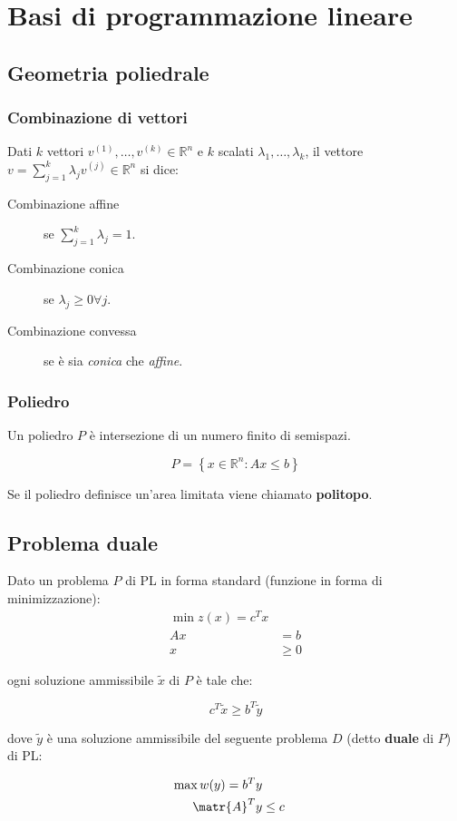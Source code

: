 \documentclass[\main/main.tex]{subfiles}
\begin{document}
\chapter{Basi di programmazione lineare}

\section{Geometria poliedrale}

\subsection{Combinazione di vettori}
Dati $k$ vettori $v^{(1)},\ldots,v^{(k)} \in \mathbb{R}^n$ e $k$ scalati $\lambda_1,\ldots,\lambda_k$, il vettore $v = \sum_{j=1}^k \lambda_j v^{(j)} \in \mathbb{R}^n$ si dice:

\begin{description}
  \item[Combinazione affine] se $\sum_{j=1}^k \lambda_j = 1$.
  \item[Combinazione conica] se $\lambda_j \geq 0 \forall j$.
  \item[Combinazione convessa] se è sia \textit{conica} che \textit{affine}.
\end{description}

\subsection{Poliedro}
Un poliedro $P$ è intersezione di un numero finito di semispazi.

\[
  P = \left\{ x \in \mathbb{R}^n: Ax \leq b \right\}
\]

Se il poliedro definisce un'area limitata viene chiamato \textbf{politopo}.

\section{Problema duale}
\begin{theorem}
  Dato un problema $P$ di PL in forma standard (funzione in forma di minimizzazione):
  \begin{align*}
    \min z(x) = c^T x \\
    Ax & = b          \\
    x  & \geq 0
  \end{align*}

  ogni soluzione ammissibile $\tilde{x}$ di $P$ è tale che:

  \[
    c^T\tilde{x} \geq b^T \tilde{y}
  \]

  dove $\tilde{y}$ è una soluzione ammissibile del seguente problema $D$ (detto \textbf{duale} di $P$) di PL:

  \begin{align*}
    \max w(y) = b^T y \\
    \matr{A}^Ty & \leq c
  \end{align*}
\end{theorem}
\end{document}
